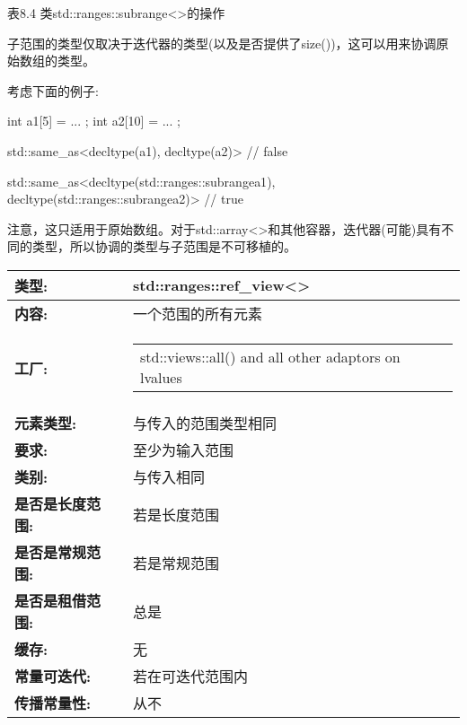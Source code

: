 \begin{center}
表8.4 类std::ranges::subrange<>的操作
\end{center}


子范围的类型仅取决于迭代器的类型(以及是否提供了size())，这可以用来协调原始数组的类型。

考虑下面的例子:

\begin{cpp}
int a1[5] = { ... };
int a2[10] = { ... };

std::same_as<decltype(a1), decltype(a2)> // false

std::same_as<decltype(std::ranges::subrange{a1}),
			 decltype(std::ranges::subrange{a2})> // true
\end{cpp}

注意，这只适用于原始数组。对于std::array<>和其他容器，迭代器(可能)具有不同的类型，所以协调的类型与子范围是不可移植的。


\begin{longtable}[c]{|l|l|}
\hline
\textbf{类型:}                 & std::ranges::ref\_view\textless{}\textgreater{} \\ \hline
\endfirsthead
%
\endhead
%
\textbf{内容:}              & 一个范围的所有元素   \\ \hline
\textbf{工厂:}      & \begin{tabular}[c]{@{}l@{}}std::views::all() and all other adaptors on lvalues\end{tabular} \\ \hline
\textbf{元素类型:}         & 与传入的范围类型相同                 \\ \hline
\textbf{要求:}             & 至少为输入范围                     \\ \hline
\textbf{类别:}             & 与传入相同                                 \\ \hline
\textbf{是否是长度范围:} & 若是长度范围                                                \\ \hline
\textbf{是否是常规范围:}      & 若是常规范围                         \\ \hline
\textbf{是否是租借范围:}    & 总是                                         \\ \hline
\textbf{缓存:}               & 无                                        \\ \hline
\textbf{常量可迭代:}       & 若在可迭代范围内               \\ \hline
\textbf{传播常量性:} & 从不                                          \\ \hline
\end{longtable}

